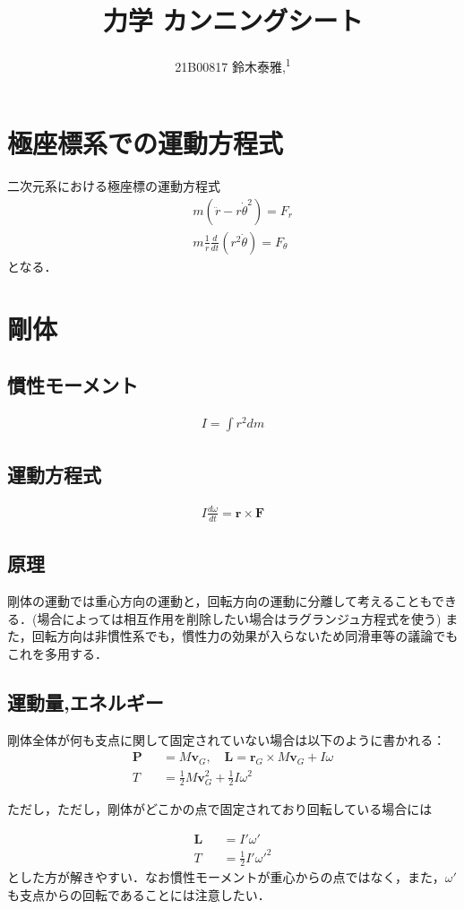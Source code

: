 \documentclass[12pt,dvipdfmx]{jsarticle}
\newcommand\authormark[1]{\textsuperscript{#1}}
\begin{document}
\title{力学 カンニングシート}

\author{21B00817 鈴木泰雅,\authormark{1}}
\section*{\Large{極座標系での運動方程式}}
二次元系における極座標の運動方程式
\begin{eqnarray}
  &&m(\ddot{r}-r\dot{\theta}^2) = F_r\\
  &&m\frac{1}{r}\frac{d}{dt}(r^2\dot{\theta})= F_\theta
\end{eqnarray}
となる．
\section*{\Large{剛体}}
\subsection*{慣性モーメント}
\begin{eqnarray}
  I = \int r^2 dm
\end{eqnarray}
\subsection*{運動方程式}
\begin{eqnarray}
  I\frac{d\omega}{dt} = \bm{r}\times\bm{F}
\end{eqnarray}
\subsection*{原理}
剛体の運動では重心方向の運動と，回転方向の運動に分離して考えることもできる．(場合によっては相互作用を削除したい場合はラグランジュ方程式を使う)
また，回転方向は非慣性系でも，慣性力の効果が入らないため同滑車等の議論でもこれを多用する．
\subsection*{運動量,エネルギー}
剛体全体が何も支点に関して固定されていない場合は以下のように書かれる：
\begin{eqnarray}
  \bm{P}&&= M\bm{v}_G, \quad \bm{L}= \bm{r}_G \times M\bm{v}_G + I\omega\\
  T &&= \frac{1}{2}M\bm{v}_G^2 + \frac{1}{2}I\omega^2
\end{eqnarray}

ただし，ただし，剛体がどこかの点で固定されており回転している場合には

\begin{eqnarray}
  \bm{L}&&= I'\omega'\\
  T &&= \frac{1}{2}I'\omega'^2
\end{eqnarray}
とした方が解きやすい．なお慣性モーメントが重心からの点ではなく，また，$\omega'$も支点からの回転であることには注意したい．
\end{document}
